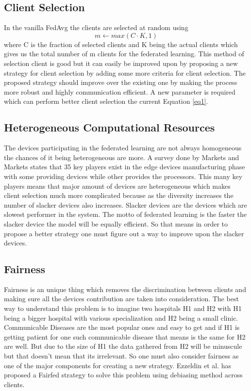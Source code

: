 \documentclass[conference]{IEEEtran}
\begin{document}
\subsection{Client Selection}

In the vanilla FedAvg the clients are selected at random using 
\begin{equation}
 m \gets max(C\cdot K,1)
 \label{eq1}
 \end{equation}
 where C is the fraction of selected clients and K being the actual clients which gives us the total number of m clients for the federated learning. This method of selection client is good but it can easily be improved upon by proposing a new strategy for client selection by adding some more criteria for client selection. The proposed strategy should improve over the existing one by making the process more robust and highly communication efficient. A new parameter is required which can perform better client selection the current Equation \ref{eq1}.   

\subsection{Heterogeneous Computational Resources}
The devices participating in the federated learning are not always homogeneous the chances of it being heterogeneous are more. A survey done by Markets and Markets \cite{market} states that 35 key players exist in the edge devices manufacturing phase with some providing devices while other provides the processors. This many key players means that major amount of devices are heterogeneous which makes client selection much more complicated because as the diversity increases the number of slacker devices also increases. Slacker devices are the devices which are slowest performer in the system. The motto of federated learning is the faster the slacker device the model will be equally efficient. So that means in order to propose a better strategy one must figure out a way to improve upon the slacker devices. 

\subsection{Fairness}
Fairness is an unique thing which removes the discrimination between clients and making sure all the devices contribution are taken into consideration. The best way to understand this problem is to imagine two hospitals H1 and H2 with H1 being a bigger hospital with various specialization and H2 being a small clinic. Communicable Diseases are the most popular ones and easy to get and if H1 is getting patient for one such communicable disease that means is the same for H2 are well. But due to the size of H1 the data gathered from H2 will be minuscule but that doesn't mean that its irrelevant. So one must also consider fairness as one of the major components for creating a new strategy. Ezzeldin et al. \cite{ezzeldin2023fairfed} has proposed a Fairfed strategy to solve this problem using debiasing method across clients.
 
\end{document}
